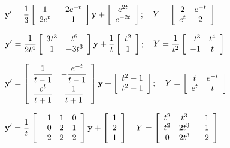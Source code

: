 \begin{exerciselist}
  \item\label{exer:10.7.14} $\displaystyle{{\bf y}'=\frac{1}{3}\left[\begin{array}{cc}1&-2e^{-t}\\2e^{t}&-1\end{array}\right]{\bf y}+ \left[\begin{array}{c}e^{2t} \\e^{-2t}\end{array}\right];\quad Y=\left[\begin{array}{cc}2&e^{-t}\\e^{t}&2\end{array}\right]}$

  \item\label{exer:10.7.15} $\displaystyle{{\bf y}'=\frac{1}{2t^{4}}\left[\begin{array}{cc}3t^{3}&t^{6}\\1&-3t^{3}\end{array}\right]{\bf y}+ \frac{1}{t}\left[\begin{array}{c}t^{2}\\1\end{array}\right];\quad Y=\frac{1}{t^{2}}\left[\begin{array}{rc}t^{3}&t^{4}\\-1&t\end{array}\right]}$

  \item\label{exer:10.7.16} $\displaystyle{{\bf y}'= \left[\begin{array}{cc}\displaystyle\frac{1}{t-1} &-\displaystyle\frac{e^{-t}}{t-1}\\[2\jot]\displaystyle\frac{e^{t}}{t+1}&\displaystyle\frac{1}{t+1}\end{array}\right]{\bf y}+\left[\begin{array}{c}t^{2}-1\\t^{2}-1\end{array}\right];\quad Y=\left[\begin{array}{cc}t&e^{-t}\\e^{t}&t\end{array}\right]}$

  \item\label{exer:10.7.17} $\displaystyle{{\bf y}'=\frac{1}{t}\left[\begin{array}{rrr} 1&1&0\\0&2&1\\-2&2&2\end{array}\right]{\bf y} +\left[\begin{array}{r}1\\2\\1\end{array}\right] \quad Y=\left[\begin{array}{ccr}t^{2}&t^{3}&1\\t^{2}&2t^{3}&-1\\0&2t^{3}&2\end{array}\right]}$


\end{exerciselist}
